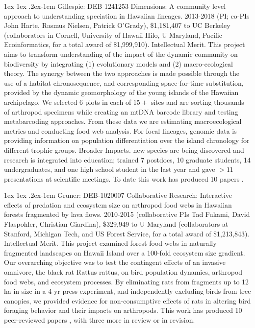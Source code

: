 \documentclass[11pt]{article}
\makeatletter
\renewcommand{\paragraph}{\@startsection{paragraph}{4}{\z@}
  {1ex \@plus 1ex \@minus .2ex}{-1em}
  {\normalfont\normalsize\it}
}
\makeatother
\begin{document}
 
\paragraph{Gillespie:} DEB 1241253 Dimensions: A community level
approach to understanding speciation in Hawaiian lineages. 2013-2018
(PI; co-PIs John Harte, Rasmus Nielsen, Patrick O’Grady), \$1,181,407
to UC Berkeley (collaborators in Cornell, University of Hawaii Hilo, U
Maryland, Pacific Ecoinformatics, for a total award of
\$1,999,910). Intellectual Merit. This project aims to transform
understanding of the impact of the dynamic community on biodiversity
by integrating (1) evolutionary models and (2) macro-ecological
theory. The synergy between the two approaches is made possible
through the use of a habitat chronosequence, and corresponding
space-for-time substitution, provided by the dynamic geomorphology of
the young islands of the Hawaiian archipelago. We selected 6 plots in
each of $15+$ sites and are sorting thousands of arthropod specimens
while creating an mtDNA barcode library and testing metabarcoding
approaches. From these data we are estimating macroecological metrics
and conducting food web analysis. For focal lineages, genomic data is
providing information on population differentiation over the island
chronology for different trophic groups. Broader Impacts. new species
are being discovered and research is integrated into education;
trained 7 postdocs, 10 graduate students, 14 undergraduates, and one
high school student in the last year and gave $> 11$ presentations at
scientific meetings. To date this work has produced 10 papers
\citep{rominger2016, rominger2015, krehenwinkel2016, gillespie2014,
  shaw2016, gillespie2016, brewer2015, brewer2014, warren2015,
  gillespie2013}.

\paragraph{Gruner:} DEB-1020007 Collaborative Research: Interactive
effects of predation and ecosystem size on arthropod food webs in
Hawaiian forests fragmented by lava flows. 2010-2015 (collaborative
PIs Tad Fukami, David Flaspohler, Christian Giardina), \$329,949 to U
Maryland (collaborators at Stanford, Michigan Tech, and US Forest
Service, for a total award of \$1,213,843). Intellectual Merit. This
project examined forest food webs in naturally fragmented landscapes
on Hawaii Island over a 100-fold ecosystem size gradient. Our
overarching objective was to test the contingent effects of an
invasive omnivore, the black rat Rattus rattus, on bird population
dynamics, arthropod food webs, and ecosystem processes. By eliminating
rats from fragments up to 12 ha in size in a 4-yr press experiment,
and independently excluding birds from tree canopies, we provided
evidence for non-consumptive effects of rats in altering bird foraging
behavior and their impacts on arthropods. This work has produced 10
peer-reviewed papers \citep{massol2011, vaughn2013, knowlton2014,
  vaughn2014, vaughn2015, knowlton2016, vannette2016}, with three more
in review or in revision.
\end{document}

